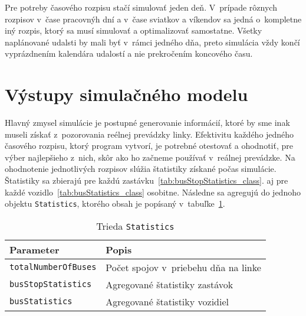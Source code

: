 Pre potreby časového rozpisu stačí simulovať jeden deň.
V~prípade rôznych rozpisov v~čase pracovnýh dní a v~čase sviatkov a víkendov sa jedná o~kompletne iný rozpis, ktorý sa musí simulovať a optimalizovať samostatne.
Všetky naplánované udalsti by mali byť v~rámci jedného dňa, preto simulácia vždy končí vyprázdnením kalendára udalostí a nie prekročením koncového času.

\section{Výstupy simulačného modelu}\label{vystupy_simulacneho_modelu}

Hlavný zmysel simulácie je postupné generovanie informácií, ktoré by sme inak museli získať z~pozorovania reélnej prevádzky linky.
Efektivitu každého jedného časového rozpisu, ktorý program vytvorí, je potrebné otestovať a ohodnotiť, pre výber najlepšieho z~nich, skôr ako ho začneme používať v~reálnej prevádzke.
Na ohodnotenie jednotlivých rozpisov slúžia štatistiky získané počas simulácie.
Štatistiky sa zbierajú pre každú zastávku~\ref{tab:busStopStatistics_class}. aj pre každé vozidlo~\ref{tab:busStatistics_class} osobitne.
Následne sa agregujú do jednoho objektu \texttt{Statistics}, ktorého obsah je popísaný v~tabuľke~\ref{tab:statistics_class}.
\begin{table}[h]\label{tab:statistics_class}
  \centering
  \begin{tabularx}{\textwidth}{|l|X|}
    \hline
    \textbf{Parameter} & \textbf{Popis} \\ \hline
    \texttt{totalNumberOfBuses} & Počet spojov v~priebehu dňa na linke \\ \hline
    \texttt{busStopStatistics} & Agregované štatistiky zastávok \\ \hline
    \texttt{busStatistics} & Agregované štatistiky vozidiel \\ \hline
  \end{tabularx}
  \caption{Trieda \texttt{Statistics}}
\end{table}

